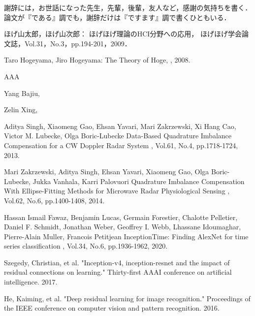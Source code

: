 \begin{acknowledgment}

謝辞には，お世話になった先生，先輩，後輩，友人など，感謝の気持ちを書く．論文が『である』調でも，謝辞だけは『ですます』調で書くひともいる．

\end{acknowledgment}

\begin{bib}[100]


  ほげ山太郎，ほげ山次郎：
  \newblock ほげほげ理論のHCI分野への応用，
  \newblock ほげほげ学会論文誌，Vol.31，No.3，pp.194-201，2009．

  Taro Hogeyama, Jiro Hogeyama:
  \newblock The Theory of Hoge,
  , 2008.

  AAA

  Yang Bajiu, 

  Zelin Xing, 
	
  Aditya Singh, Xiaomeng Gao, Ehsan Yavari, Mari Zakrzewski, Xi Hang Cao, Victor M. Lubecke, Olga Boric-Lubecke
  \newblock Data-Based Quadrature Imbalance Compensation for a CW Doppler Radar System
  , Vol.61, No.4, pp.1718-1724, 2013.

  Mari Zakrzewski, Aditya Singh, Ehsan Yavari, Xiaomeng Gao, Olga Boric-Lubecke, Jukka Vanhala, Karri Palovuori
  \newblock Quadrature Imbalance Compensation With Ellipse-Fitting Methods for Microwave Radar Physiological Sensing
  , Vol.62, No.6, pp.1400-1408, 2014.

  Hassan Ismail Fawaz, Benjamin Lucas, Germain Forestier, Chalotte Pelletier, Daniel F. Schmidt, Jonathan Weber, Geoffrey I. Webb, Lhassane Idoumaghar, Pierre-Alain Muller, Francois Petitjean
  \newblock InceptionTime: Finding AlexNet for time series classification
  , Vol.34, No.6, pp.1936-1962, 2020.

Szegedy, Christian, et al. "Inception-v4, inception-resnet and the impact of residual connections on learning." Thirty-first AAAI conference on artificial intelligence. 2017.

He, Kaiming, et al. "Deep residual learning for image recognition." Proceedings of the IEEE conference on computer vision and pattern recognition. 2016.

\end{bib}

